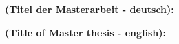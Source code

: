 \thispagestyle{empty}
\begin{center}
  \begin{minipage}[c][0.48\textheight][b]{0.9\textwidth}
    \small
    \textbf{
      (Titel der Masterarbeit - deutsch):
    }\par
    \vspace{\baselineskip}
    
  \end{minipage}\par
  \vfill
  \begin{minipage}[c][0.48\textheight][b]{0.9\textwidth}
    \small
    \textbf{
      (Title of Master thesis - english):
    }\par
    \vspace{\baselineskip}
    
  \end{minipage}
\end{center}
